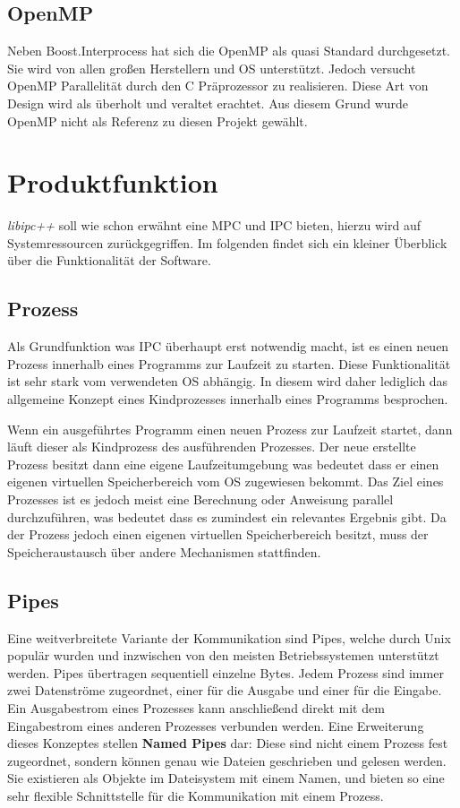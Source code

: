 \documentclass[a4paper]{book}
\begin{document}
\subsection{OpenMP}
Neben Boost.Interprocess hat sich die OpenMP als quasi Standard durchgesetzt. Sie wird von allen großen Herstellern und OS unterstützt. Jedoch versucht OpenMP Parallelität durch den C Präprozessor zu realisieren. Diese Art von Design wird als überholt und veraltet erachtet. Aus diesem Grund wurde OpenMP nicht als Referenz zu diesen Projekt gewählt.

\section{Produktfunktion}
\textit{libipc++} soll wie schon erwähnt eine MPC und IPC bieten, hierzu wird auf Systemressourcen zurückgegriffen. Im folgenden findet sich ein kleiner Überblick über die Funktionalität der Software.

\subsection{Prozess}
Als Grundfunktion was IPC überhaupt erst notwendig macht, ist es einen neuen Prozess innerhalb eines Programms zur Laufzeit zu starten. Diese Funktionalität ist sehr stark vom verwendeten OS abhängig. In diesem wird daher lediglich das allgemeine Konzept eines Kindprozesses innerhalb eines Programms besprochen.\newline

\noindent Wenn ein ausgeführtes Programm einen neuen Prozess zur Laufzeit startet, dann läuft dieser als Kindprozess des ausführenden Prozesses. Der neue erstellte Prozess besitzt dann eine eigene Laufzeitumgebung was bedeutet dass er einen eigenen virtuellen Speicherbereich vom OS zugewiesen bekommt. Das Ziel eines Prozesses ist es jedoch meist eine Berechnung oder Anweisung parallel durchzuführen, was bedeutet dass es zumindest ein relevantes Ergebnis gibt. Da der Prozess jedoch einen eigenen virtuellen Speicherbereich besitzt, muss der Speicheraustausch über andere Mechanismen stattfinden.

\subsection{Pipes}
Eine weitverbreitete Variante der Kommunikation sind Pipes, welche durch Unix populär wurden und inzwischen von den meisten Betriebssystemen unterstützt werden. Pipes übertragen sequentiell einzelne Bytes. Jedem Prozess sind immer zwei Datenströme zugeordnet, einer für die Ausgabe und einer für die Eingabe. Ein Ausgabestrom eines Prozesses kann anschließend direkt mit dem Eingabestrom eines anderen Prozesses verbunden werden. \newline
Eine Erweiterung dieses Konzeptes stellen \textbf{Named Pipes} dar: Diese sind nicht einem Prozess fest zugeordnet, sondern können genau wie Dateien geschrieben und gelesen werden. Sie existieren als Objekte im Dateisystem mit einem Namen, und bieten so eine sehr flexible Schnittstelle für die Kommunikation mit einem Prozess.
\end{document}
